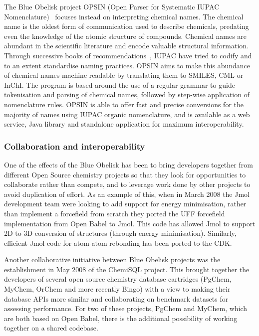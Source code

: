 \documentclass[10pt]{bmc_article}
\newenvironment{bmcformat}{\begin{raggedright}\baselineskip20pt\sloppy\setboolean{publ}{false}}{\end{raggedright}\baselineskip20pt\sloppy}
\begin{document}
\begin{bmcformat}
The Blue Obelisk project OPSIN (Open Parser for Systematic IUPAC
Nomenclature)~\cite{lowe_chemical_2011} focuses instead on interpreting chemical names.
The chemical name is the oldest form of communication used to
describe chemicals, predating
even the knowledge of the atomic structure of compounds.
Chemical names are abundant in the scientific
literature and encode valuable structural information.
Through successive books of
recommendations~\cite{iupac_nomenclature_1979, iupac_guide_1993},
IUPAC have tried to codify and to an extent standardise naming practices.
OPSIN aims to make this abundance of
chemical names machine readable by translating them to SMILES, CML or
InChI. The program is based around the use of a regular grammar to
guide tokenisation and parsing of chemical names, followed by
step-wise application of nomenclature rules. OPSIN is able to offer
fast and precise conversions for the majority of names using IUPAC
organic nomenclature, and is available as a web service, Java
library and standalone application for maximum interoperability.

  \subsubsection*{Collaboration and interoperability}

One of the effects of the Blue Obelisk has been to bring developers
together from different Open Source chemistry projects so that they
look for opportunities to collaborate rather than compete, and to
leverage work done by other projects to avoid duplication of effort.
As an example of this, when in March 2008 the Jmol development team
were looking to add support for energy minimisation, rather than
implement a forcefield from scratch they ported the UFF forcefield
implementation from Open Babel to Jmol. This code has allowed Jmol to
support 2D to 3D conversion of structures (through energy
minimisation). Similarly, efficient Jmol code for atom-atom rebonding
has been ported to the CDK.

Another collaborative initiative between Blue Obelisk projects was the establishment in May 2008 of
the ChemiSQL project. This brought together the developers of several
open source chemistry database cartridges (PgChem, MyChem, OrChem and
more recently Bingo) with a view to making their database APIs more
similar and collaborating on benchmark datasets for assessing
performance. For two of these projects, PgChem and MyChem, which are both based on
Open Babel, there is the additional possibility of working together on a shared
codebase.


\end{bmcformat}
\end{document}
